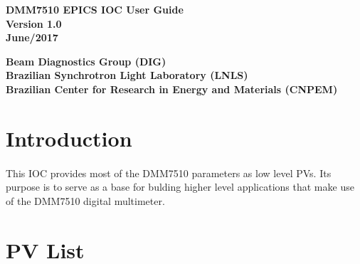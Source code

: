 \documentclass[openany]{article}
\begin{document}
\begin{titlepage}


\begin{center}

\vspace*{\fill}
\textbf{\Huge DMM7510 EPICS IOC User Guide}\\[20pt]
\textbf{\Huge Version 1.0}\\[20pt]
\textbf{\Huge June/2017}
\vspace*{\fill}

\vfill
\textbf{Beam Diagnostics Group (DIG)}\\[5pt]
\textbf{Brazilian Synchrotron Light Laboratory (LNLS)}\\[5pt]
\textbf{Brazilian Center for Research in Energy and Materials (CNPEM)}
\end{center}

\end{titlepage}

\newpage
\pagestyle{plain} %

\tableofcontents
\listoftables

\newpage
\section{Introduction}

	\paragraph{} This IOC provides most of the DMM7510 parameters as low level PVs. Its purpose is to serve as a base for bulding higher level applications that make use of the DMM7510 digital multimeter.

\section{PV List}

	\renewcommand{\arraystretch}{2}
\end{document}

